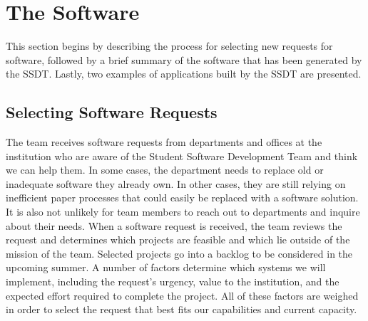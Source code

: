 \section{The Software}
This section begins by describing the process for selecting new requests for software, followed by a brief summary of the software that has been generated by the SSDT. Lastly, two examples of applications built by the SSDT are presented.

\subsection{Selecting Software Requests}
The team receives software requests from departments and offices at the institution who are aware of the Student Software Development Team and think we can help them. In some cases, the department needs to replace old or inadequate software they already own. In other cases, they are still relying on inefficient paper processes that could easily be replaced with a software solution. It is also not unlikely for team members to reach out to departments and inquire about their needs. When a software request is received, the team reviews the request and determines which projects are feasible and which lie outside of the mission of the team. Selected projects go into a backlog to be considered in the upcoming summer. A number of factors determine which systems we will implement, including the request's urgency, value to the institution, and the expected effort required to complete the project. All of these factors are weighed in order to select the request that best fits our capabilities and current capacity.


